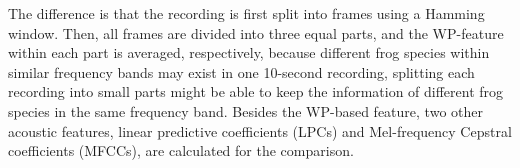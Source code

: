 
The difference is that the recording is first split into frames using a Hamming window. Then, all frames are divided into three equal parts, and the WP-feature within each part is averaged, respectively, because different frog species within similar frequency bands may exist in one 10-second recording, splitting each recording into small parts might be able to keep the information of different frog species in the same frequency band. Besides the WP-based feature, two other acoustic features, linear predictive coefficients (LPCs) and Mel-frequency Cepstral coefficients (MFCCs), are calculated for the comparison.




